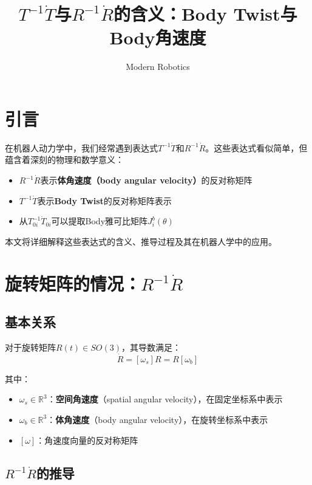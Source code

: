 \documentclass[12pt,a4paper]{article}
\title{$T^{-1}\dot{T}$与$R^{-1}\dot{R}$的含义：Body Twist与Body角速度}
\author{Modern Robotics}
\date{}
\begin{document}
\maketitle

\tableofcontents
\newpage

\section{引言}

在机器人动力学中，我们经常遇到表达式$T^{-1}\dot{T}$和$R^{-1}\dot{R}$。这些表达式看似简单，但蕴含着深刻的物理和数学意义：

\begin{itemize}
\item $R^{-1}\dot{R}$表示\textbf{体角速度（body angular velocity）}的反对称矩阵
\item $T^{-1}\dot{T}$表示\textbf{Body Twist}的反对称矩阵表示
\item 从$T_{0i}^{-1}\dot{T}_{0i}$可以提取Body雅可比矩阵$J_i^b(\theta)$
\end{itemize}

本文将详细解释这些表达式的含义、推导过程及其在机器人学中的应用。

\section{旋转矩阵的情况：$R^{-1}\dot{R}$}

\subsection{基本关系}

对于旋转矩阵$R(t) \in SO(3)$，其导数满足：
\begin{equation}
\dot{R} = [\omega_s] R = R [\omega_b]
\label{eq:R_dot}
\end{equation}

其中：
\begin{itemize}
\item $\omega_s \in \mathbb{R}^3$：\textbf{空间角速度}（spatial angular velocity），在固定坐标系中表示
\item $\omega_b \in \mathbb{R}^3$：\textbf{体角速度}（body angular velocity），在旋转坐标系中表示
\item $[\omega]$：角速度向量的反对称矩阵
\end{itemize}

\subsection{$R^{-1}\dot{R}$的推导}
\end{document}

